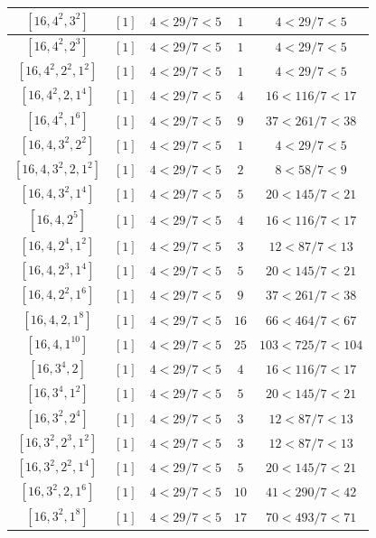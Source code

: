 \documentclass{article}%
\begin{document}
\begin{center}
\begin{longtable}{||c|c|c|c|c||}
$[16, 4^{2}, 3^{2}]$ & $[1]$ & $4 < 29/7 < 5$ & $1$ & $4 < 29/7 < 5$ \\ \hline 
$[16, 4^{2}, 2^{3}]$ & $[1]$ & $4 < 29/7 < 5$ & $1$ & $4 < 29/7 < 5$ \\ \hline 
$[16, 4^{2}, 2^{2}, 1^{2}]$ & $[1]$ & $4 < 29/7 < 5$ & $1$ & $4 < 29/7 < 5$ \\ \hline 
$[16, 4^{2}, 2, 1^{4}]$ & $[1]$ & $4 < 29/7 < 5$ & $4$ & $16 < 116/7 < 17$ \\ \hline 
$[16, 4^{2}, 1^{6}]$ & $[1]$ & $4 < 29/7 < 5$ & $9$ & $37 < 261/7 < 38$ \\ \hline 
$[16, 4, 3^{2}, 2^{2}]$ & $[1]$ & $4 < 29/7 < 5$ & $1$ & $4 < 29/7 < 5$ \\ \hline 
$[16, 4, 3^{2}, 2, 1^{2}]$ & $[1]$ & $4 < 29/7 < 5$ & $2$ & $8 < 58/7 < 9$ \\ \hline 
$[16, 4, 3^{2}, 1^{4}]$ & $[1]$ & $4 < 29/7 < 5$ & $5$ & $20 < 145/7 < 21$ \\ \hline 
$[16, 4, 2^{5}]$ & $[1]$ & $4 < 29/7 < 5$ & $4$ & $16 < 116/7 < 17$ \\ \hline 
$[16, 4, 2^{4}, 1^{2}]$ & $[1]$ & $4 < 29/7 < 5$ & $3$ & $12 < 87/7 < 13$ \\ \hline 
$[16, 4, 2^{3}, 1^{4}]$ & $[1]$ & $4 < 29/7 < 5$ & $5$ & $20 < 145/7 < 21$ \\ \hline 
$[16, 4, 2^{2}, 1^{6}]$ & $[1]$ & $4 < 29/7 < 5$ & $9$ & $37 < 261/7 < 38$ \\ \hline 
$[16, 4, 2, 1^{8}]$ & $[1]$ & $4 < 29/7 < 5$ & $16$ & $66 < 464/7 < 67$ \\ \hline 
$[16, 4, 1^{10}]$ & $[1]$ & $4 < 29/7 < 5$ & $25$ & $103 < 725/7 < 104$ \\ \hline 
$[16, 3^{4}, 2]$ & $[1]$ & $4 < 29/7 < 5$ & $4$ & $16 < 116/7 < 17$ \\ \hline 
$[16, 3^{4}, 1^{2}]$ & $[1]$ & $4 < 29/7 < 5$ & $5$ & $20 < 145/7 < 21$ \\ \hline 
$[16, 3^{2}, 2^{4}]$ & $[1]$ & $4 < 29/7 < 5$ & $3$ & $12 < 87/7 < 13$ \\ \hline 
$[16, 3^{2}, 2^{3}, 1^{2}]$ & $[1]$ & $4 < 29/7 < 5$ & $3$ & $12 < 87/7 < 13$ \\ \hline 
$[16, 3^{2}, 2^{2}, 1^{4}]$ & $[1]$ & $4 < 29/7 < 5$ & $5$ & $20 < 145/7 < 21$ \\ \hline 
$[16, 3^{2}, 2, 1^{6}]$ & $[1]$ & $4 < 29/7 < 5$ & $10$ & $41 < 290/7 < 42$ \\ \hline 
$[16, 3^{2}, 1^{8}]$ & $[1]$ & $4 < 29/7 < 5$ & $17$ & $70 < 493/7 < 71$ \\ \hline 

\end{longtable}
\end{center}
\end{document}
